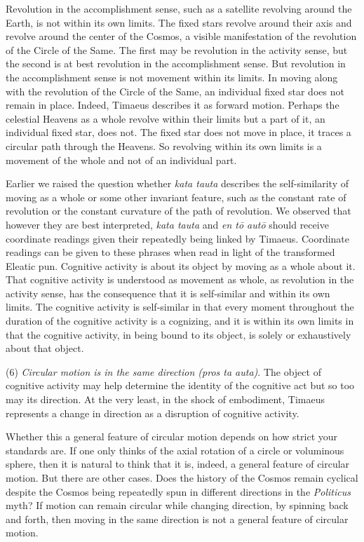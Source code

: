 Revolution in the accomplishment sense, such as a satellite revolving around the Earth, is not within its own limits. The fixed stars revolve around their axis and revolve around the center of the Cosmos, a visible manifestation of the revolution of the Circle of the Same. The first may be revolution in the activity sense, but the second is at best revolution in the accomplishment sense. But revolution in the accomplishment sense is not movement within its limits. In moving along with the revolution of the Circle of the Same, an individual fixed star does not remain in place. Indeed, Timaeus describes it as forward motion. Perhaps the celestial Heavens as a whole revolve within their limits but a part of it, an individual fixed star, does not. The fixed star does not move in place, it traces a circular path through the Heavens. So revolving within its own limits is a movement of the whole and not of an individual part.

Earlier we raised the question whether \emph{kata tauta} describes the self-similarity of moving as a whole or some other invariant feature, such as the constant rate of revolution or the constant curvature of the path of revolution. We observed that however they are best interpreted, \emph{kata tauta} and \emph{en tō autō} should receive coordinate readings given their repeatedly being linked by Timaeus. Coordinate readings can be given to these phrases when read in light of the transformed Eleatic pun. Cognitive activity is about its object by moving as a whole about it. That cognitive activity is understood as movement as whole, as revolution in the activity sense, has the consequence that it is self-similar and within its own limits. The cognitive activity is self-similar in that every moment throughout the duration of the cognitive activity is a cognizing, and it is within its own limits in that the cognitive activity, in being bound to its object, is solely or exhaustively about that object.

(6) \emph{Circular motion is in the same direction (\emph{pros ta auta})}. The object of cognitive activity may help determine the identity of the cognitive act but so too may its direction. At the very least, in the shock of embodiment, Timaeus represents a change in direction as a disruption of cognitive activity. 

Whether this a general feature of circular motion depends on how strict your standards are. If one only thinks of the axial rotation of a circle or voluminous sphere, then it is natural to think that it is, indeed, a general feature of circular motion. But there are other cases. Does the history of the Cosmos remain cyclical despite the Cosmos being repeatedly spun in different directions in the \emph{Politicus} myth? If motion can remain circular while changing direction, by spinning back and forth, then moving in the same direction is not a general feature of circular motion.

